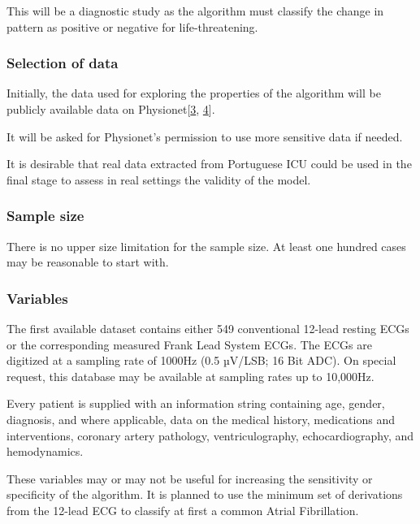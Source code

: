 \documentclass[runningheads]{llncs}
\begin{document}
This will be a diagnostic study as the algorithm must classify the
change in pattern as positive or negative for life-threatening.

\hypertarget{selection-of-data}{%
\subsubsection{Selection of data}\label{selection-of-data}}

Initially, the data used for exploring the properties of the algorithm
will be publicly available data on
Physionet{[}\protect\hyperlink{ref-Clifford2015}{3},
\protect\hyperlink{ref-Goldberger2000}{4}{]}.

It will be asked for Physionet's permission to use more sensitive data
if needed.

It is desirable that real data extracted from Portuguese ICU could be
used in the final stage to assess in real settings the validity of the
model.

\hypertarget{sample-size}{%
\subsubsection{Sample size}\label{sample-size}}

There is no upper size limitation for the sample size. At least one
hundred cases may be reasonable to start with.

\hypertarget{variables}{%
\subsubsection{Variables}\label{variables}}

The first available dataset contains either 549 conventional 12-lead
resting ECGs or the corresponding measured Frank Lead System ECGs. The
ECGs are digitized at a sampling rate of 1000Hz (0.5 µV/LSB; 16 Bit
ADC). On special request, this database may be available at sampling
rates up to 10,000Hz.

Every patient is supplied with an information string containing age,
gender, diagnosis, and where applicable, data on the medical history,
medications and interventions, coronary artery pathology,
ventriculography, echocardiography, and hemodynamics.

These variables may or may not be useful for increasing the sensitivity
or specificity of the algorithm. It is planned to use the minimum set of
derivations from the 12-lead ECG to classify at first a common Atrial
Fibrillation.
\end{document}
